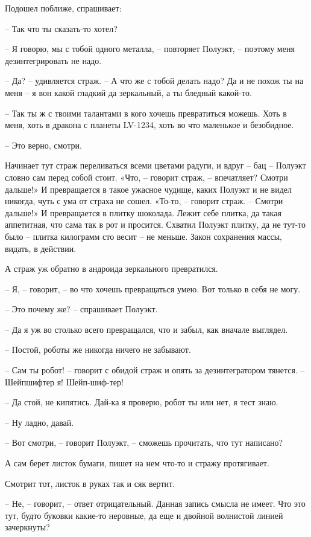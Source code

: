 \documentclass[ebook,oneside,final,openright]{memoir}
\begin{document}
Подошел поближе, спрашивает: \par
– Так что ты сказать-то хотел? \par
– Я говорю, мы с тобой одного металла, – повторяет Полуэкт, – поэтому меня дезинтегрировать не надо. \par
– Да? – удивляется страж. – А что же с тобой делать надо? Да и не похож ты на меня – я вон какой гладкий да зеркальный, а ты бледный какой-то. \par
– Так ты ж с твоими талантами в кого хочешь превратиться можешь. Хоть в меня, хоть в дракона с планеты LV-1234, хоть во что маленькое и безобидное. \par
– Это верно, смотри. \par
\par
Начинает тут страж переливаться всеми цветами радуги, и вдруг – бац – Полуэкт словно сам перед собой стоит. «Что, – говорит страж, – впечатляет? Смотри дальше!» И превращается в такое ужасное чудище, каких Полуэкт и не видел никогда, чуть с ума от страха не сошел. «То-то, – говорит страж. – Смотри дальше!» И превращается в плитку шоколада. Лежит себе плитка, да такая аппетитная, что сама так в рот и просится. Схватил Полуэкт плитку, да не тут-то было – плитка килограмм сто весит – не меньше. Закон сохранения массы, видать, в действии. \par
\par
А страж уж обратно в андроида зеркального превратился. \par
– Я, – говорит, – во что хочешь превращаться умею. Вот только в себя не могу. \par
– Это почему же? – спрашивает Полуэкт.\par
– Да я уж во столько всего превращался, что и забыл, как вначале выглядел. \par
– Постой, роботы же никогда ничего не забывают. \par
– Сам ты робот! – говорит с обидой страж и опять за дезинтегратором тянется. – Шейпшифтер я! Шейп-шиф-тер! \par
– Да стой, не кипятись. Дай-ка я проверю, робот ты или нет, я тест знаю. \par
– Ну ладно, давай. \par
– Вот смотри, – говорит Полуэкт, – сможешь прочитать, что тут написано? \par
А сам берет листок бумаги, пишет на нем что-то и стражу протягивает. \par
Смотрит тот, листок в руках так и сяк вертит. \par
– Не, – говорит, – ответ отрицательный. Данная запись смысла не имеет. Что это тут, будто буковки какие-то неровные, да еще и двойной волнистой линией зачеркнуты? \par
\end{document}
